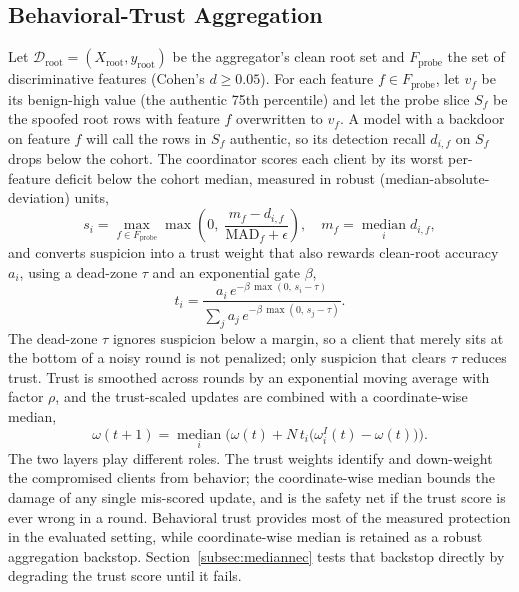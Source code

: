 \documentclass[journal]{IEEEtran}
\begin{document}
\subsection{Behavioral-Trust Aggregation}
Let $\mathcal{D}_{\text{root}} = (X_{\text{root}}, y_{\text{root}})$ be the aggregator's clean root set and $F_{\text{probe}}$ the set of discriminative features (Cohen's $d \geq 0.05$). For each feature $f \in F_{\text{probe}}$, let $v_f$ be its benign-high value (the authentic 75th percentile) and let the probe slice $S_f$ be the spoofed root rows with feature $f$ overwritten to $v_f$. A model with a backdoor on feature $f$ will call the rows in $S_f$ authentic, so its detection recall $d_{i,f}$ on $S_f$ drops below the cohort. The coordinator scores each client by its worst per-feature deficit below the cohort median, measured in robust (median-absolute-deviation) units,
\begin{equation}
s_i = \max_{f \in F_{\text{probe}}} \max\!\left(0,\; \frac{m_f - d_{i,f}}{\mathrm{MAD}_f + \epsilon}\right), \quad m_f = \operatorname*{median}_i d_{i,f},
\label{eq:susp}
\end{equation}
and converts suspicion into a trust weight that also rewards clean-root accuracy $a_i$, using a dead-zone $\tau$ and an exponential gate $\beta$,
\begin{equation}
t_i = \frac{a_i \, e^{-\beta\, \max(0,\, s_i - \tau)}}{\sum_{j} a_j \, e^{-\beta\, \max(0,\, s_j - \tau)}}.
\label{eq:trust}
\end{equation}
The dead-zone $\tau$ ignores suspicion below a margin, so a client that merely sits at the bottom of a noisy round is not penalized; only suspicion that clears $\tau$ reduces trust. Trust is smoothed across rounds by an exponential moving average with factor $\rho$, and the trust-scaled updates are combined with a coordinate-wise median,
\begin{equation}
\omega(t+1) = \operatorname*{median}_i\Big(\omega(t) + N\, t_i \big(\omega_i^{I}(t) - \omega(t)\big)\Big).
\label{eq:robustagg}
\end{equation}
The two layers play different roles. The trust weights identify and down-weight the compromised clients from behavior; the coordinate-wise median bounds the damage of any single mis-scored update, and is the safety net if the trust score is ever wrong in a round. Behavioral trust provides most of the measured protection in the evaluated setting, while coordinate-wise median is retained as a robust aggregation backstop. Section~\ref{subsec:mediannec} tests that backstop directly by degrading the trust score until it fails.
\end{document}
